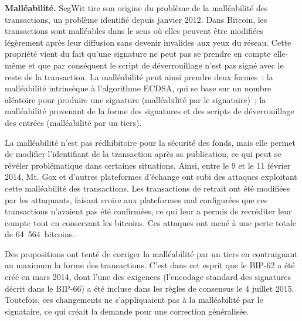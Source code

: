 
\textbf{Malléabilité.} SegWit tire son origine du problème de la malléabilité des transactions, un problème identifié depuis janvier 2012. Dans Bitcoin, les transactions sont malléables dans le sens où elles peuvent être modifiées légèrement après leur diffusion sans devenir invalides aux yeux du réseau. Cette propriété vient du fait qu'une signature ne peut pas se prendre en compte elle-même et que par conséquent le script de déverrouillage n'est pas signé avec le reste de la transaction. La malléabilité peut ainsi prendre deux formes~: la malléabilité intrinsèque à l'algorithme ECDSA, qui se base sur un nombre aléatoire pour produire une signature (malléabilité par le signataire)~; la malléabilité provenant de la forme des signatures et des scripts de déverrouillage des entrées (malléabilité par un tiers).

La malléabilité n'est pas rédhibitoire pour la sécurité des fonds, mais elle permet de modifier l'identifiant de la transaction après sa publication, ce qui peut se révéler problématique dans certaines situations. Ainsi, entre le 9 et le 11 février 2014, Mt. Gox et d'autres plateformes d'échange ont subi des attaques exploitant cette malléabilité des transactions. Les transactions de retrait ont été modifiées par les attaquants, faisant croire aux plateformes mal configurées que ces transactions n'avaient pas été confirmées, ce qui leur a permis de recréditer leur compte tout en conservant les bitcoins. Ces attaques ont mené à une perte totale de 64~564~bitcoins.

Des propositions ont tenté de corriger la malléabilité par un tiers en contraignant au maximum la forme des transactions. C'est dans cet esprit que le BIP-62 a été créé en mars 2014, dont l'une des exigences (l'encodage standard des signatures décrit dans le BIP-66) a été incluse dans les règles de consensus le 4 juillet 2015. Toutefois, ces changements ne s'appliquaient pas à la malléabilité par le signataire, ce qui créait la demande pour une correction généralisée.

